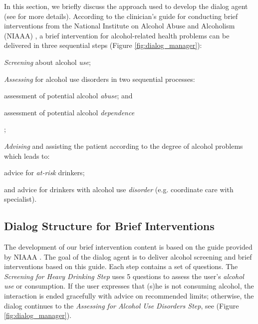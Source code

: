 \documentclass[letterpaper]{article}
\begin{document}
In this section, we briefly discuss the approach used to develop the dialog 
agent (see \cite{YASCLL14} for more details). According to the 
clinician's guide for conducting brief interventions from the National Institute on Alcohol Abuse 
and Alcoholism (NIAAA) \cite{national2007helping}, a brief intervention for alcohol-related health 
problems can be delivered in three sequential steps (Figure 
\ref{fig:dialog_manager}): \begin{inparaenum}[1)] \item {\em Screening} about alcohol {\em use}; \item 
{\em Assessing} for alcohol use disorders in two sequential processes: \begin{inparaenum}[a)] \item 
assessment of potential alcohol {\em abuse}; and \item assessment  of potential alcohol {\em 
dependence}\end{inparaenum}; \item {\em Advising} and assisting the patient according to 
the degree of alcohol problems which leads to: \begin{inparaenum} \item advice for {\em at-risk} 
drinkers; \item and advice for drinkers with alcohol use {\em disorder} (e.g. coordinate care with specialist). \end{inparaenum} 
\end{inparaenum}

\subsection*{Dialog Structure for Brief Interventions}

The development of our brief intervention content is based on the guide provided by 
NIAAA \cite{national2006niaaa}. The goal of the dialog agent is to deliver alcohol screening and 
brief interventions based on this guide. Each step contains a set of questions. The {\em Screening for Heavy Drinking  Step}
uses 5 questions to assess the user's {\em alcohol use} or consumption.  If the user 
expresses that (s)he is not consuming alcohol, the interaction is  ended gracefully with advice on recommended limits; otherwise, the dialog continues to the {\em Assessing for Alcohol Use Disorders Step}, see (Figure \ref{fig:dialog_manager}).
\end{document}
